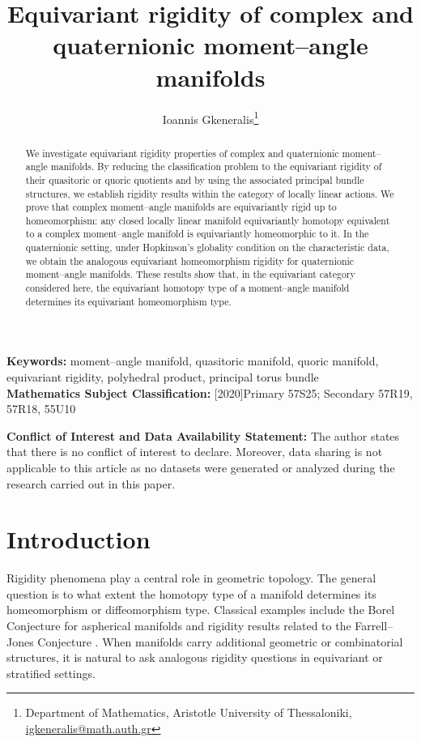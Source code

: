 \documentclass[11pt,a4paper]{article}
\title{Equivariant rigidity of complex and quaternionic moment--angle manifolds}
\author{Ioannis Gkeneralis\footnote{Department of Mathematics, Aristotle University of Thessaloniki, \href{mailto:igkeneralis@math.auth.gr}{igkeneralis@math.auth.gr}}}
\date{ }
\numberwithin{equation}{section}
\theoremstyle{named}
\newcommand{\keywords}[1]{\textbf{Keywords: } #1}
\newcommand{\msc}[1]{\textbf{Mathematics Subject Classification: } #1}
\begin{document}
\vspace{-0.5cm}

\maketitle

\begin{abstract}
We investigate equivariant rigidity properties of complex and quaternionic moment--angle manifolds. By reducing the classification problem to the equivariant rigidity of their quasitoric or quoric quotients and by using the associated principal bundle structures, we establish rigidity results within the category of locally linear actions. We prove that complex moment--angle manifolds are equivariantly rigid up to homeomorphism: any closed locally linear manifold equivariantly homotopy equivalent to a complex moment--angle manifold is equivariantly homeomorphic to it. In the quaternionic setting, under Hopkinson's globality condition on the characteristic data, we obtain the analogous equivariant homeomorphism rigidity for quaternionic moment--angle manifolds. These results show that, in the equivariant category considered here, the equivariant homotopy type of a moment--angle manifold determines its equivariant homeomorphism type.
\end{abstract}

\noindent \keywords{moment--angle manifold, quasitoric manifold, quoric manifold, equivariant rigidity, polyhedral product, principal torus bundle} \\[1ex]
\msc[2020]{Primary  57S25; Secondary 57R19, 57R18, 55U10 }

\vspace{0.5ex}
\noindent \textbf{Conflict of Interest and Data Availability Statement:} The author states that there is no conflict of interest to declare. Moreover, data sharing is not applicable to this article as no datasets were generated or analyzed during the research carried out in this paper.


\tableofcontents

\section{Introduction}

Rigidity phenomena play a central role in geometric topology. The general question is to what extent the homotopy type of a manifold determines its homeomorphism or diffeomorphism type. Classical examples include the Borel Conjecture for aspherical manifolds and rigidity results related to the Farrell--Jones Conjecture \cite{luckreich}. When manifolds carry additional geometric or combinatorial structures, it is natural to ask analogous rigidity questions in equivariant or stratified settings.
\end{document}
